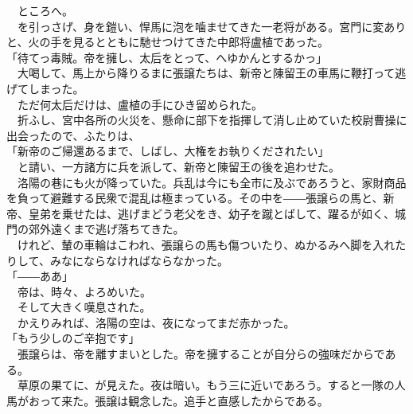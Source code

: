\documentclass[
  paper=a5,
  fontsize=10pt,
  jafontsize=9.5pt,
  tate,                  %
  open_bracket_pos=nibu, %
]{jlreq}
\begin{document}
　ところへ。\\


　を引っさげ、身を鎧い、悍馬に泡を噛ませてきた一老将がある。宮門に変ありと、火の手を見るとともに馳せつけてきた中郎将盧植であった。\\


「待てっ毒賊。帝を擁し、太后をとって、へゆかんとするかっ」\\


　大喝して、馬上から降りるまに張譲たちは、新帝と陳留王の車馬に鞭打って逃げてしまった。\\


　ただ何太后だけは、盧植の手にひき留められた。\\


　折ふし、宮中各所の火災を、懸命に部下を指揮して消し止めていた校尉曹操に出会ったので、ふたりは、\\


「新帝のご帰還あるまで、しばし、大権をお執りくだされたい」\\


　と請い、一方諸方に兵を派して、新帝と陳留王の後を追わせた。\\


　洛陽の巷にも火が降っていた。兵乱は今にも全市に及ぶであろうと、家財商品を負って避難する民衆で混乱は極まっている。その中を――張譲らの馬と、新帝、皇弟を乗せたは、逃げまどう老父をき、幼子を蹴とばして、躍るが如く、城門の郊外遠くまで逃げ落ちてきた。\\


　けれど、輦の車輪はこわれ、張譲らの馬も傷ついたり、ぬかるみへ脚を入れたりして、みなにならなければならなかった。\\


「――ああ」\\


　帝は、時々、よろめいた。\\


　そして大きく嘆息された。\\


　かえりみれば、洛陽の空は、夜になってまだ赤かった。\\


「もう少しのご辛抱です」\\


　張譲らは、帝を離すまいとした。帝を擁することが自分らの強味だからである。\\


　草原の果てに、が見えた。夜は暗い。もう三に近いであろう。すると一隊の人馬がおって来た。張譲は観念した。追手と直感したからである。\\
\end{document}
